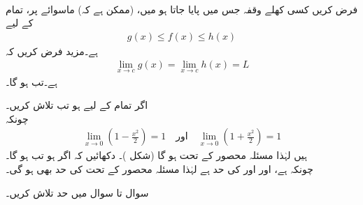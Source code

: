 \\
فرض کریں کسی کھلے وقفہ جس میں  پایا جاتا ہو میں،  (ممکن ہے کہ) ماسوائے  پر،  تمام  کے لیے
\begin{align*}
g(x)\le f(x)\le h(x)
\end{align*}
ہے۔مزید فرض کریں کہ 
\begin{align*}
\lim_{x\to c} g(x)=\lim_{x\to c}h(x)=L
\end{align*}
ہے۔تب  ہو گا۔

اگر تمام  کے لیے  ہو تب  تلاش کریں۔\\
چونکہ
\begin{align*}
\lim_{x\to 0} (1-\tfrac{x^2}{2})=1\quad \text{اور}\quad \lim_{x\to 0} (1+\tfrac{x^2}{2})=1
\end{align*}
ہیں لہٰذا مسئلہ محصور کے تحت  ہو گا (شکل )۔
دکھائیں کہ اگر  ہو تب  ہو گا۔\\
چونکہ  ہے، اور  اور  کی حد  ہے لہٰذا مسئلہ محصور کے تحت  کی حد بھی  ہو گی۔ 
 

سوال  تا سوال  میں حد تلاش کریں۔

